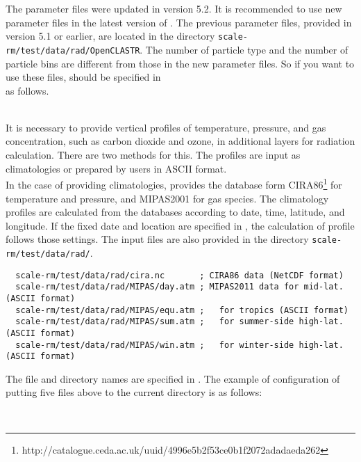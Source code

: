 The parameter files were updated in version 5.2.
It is recommended to use new parameter files in the latest version of \scalerm.
The previous parameter files, provided in version 5.1 or earlier,
are located in the directory \verb|scale-rm/test/data/rad/OpenCLASTR|.
The number of particle type and the number of particle bins are different from those in the new parameter files.
So if you want to use these files,  should be specified in \\
 as follows.

\\

It is necessary to provide vertical profiles of temperature, pressure, and gas concentration, such as carbon dioxide and ozone,
in additional layers for radiation calculation.
There are two methods for this. The profiles are input as climatologies or prepared by users in ASCII format. \\

In the case of providing climatologies, \scalerm provides the database form CIRA86\footnote{http://catalogue.ceda.ac.uk/uuid/4996e5b2f53ce0b1f2072adadaeda262} \citep{CSR_2006} for temperature and pressure,
and MIPAS2001 \citep{Remedios_2007} for gas species.
The climatology profiles are calculated from the databases according to date, time, latitude, and longitude.
If the fixed date and location are specified in , the calculation of profile follows those settings.
The input files are also provided in the directory \verb|scale-rm/test/data/rad/|.
\begin{verbatim}
  scale-rm/test/data/rad/cira.nc       ; CIRA86 data (NetCDF format)
  scale-rm/test/data/rad/MIPAS/day.atm ; MIPAS2011 data for mid-lat. (ASCII format)
  scale-rm/test/data/rad/MIPAS/equ.atm ;   for tropics (ASCII format)
  scale-rm/test/data/rad/MIPAS/sum.atm ;   for summer-side high-lat. (ASCII format)
  scale-rm/test/data/rad/MIPAS/win.atm ;   for winter-side high-lat. (ASCII format)
\end{verbatim}
The file and directory names are specified in .
The example of configuration of putting five files above to the current directory is as follows:

\\

